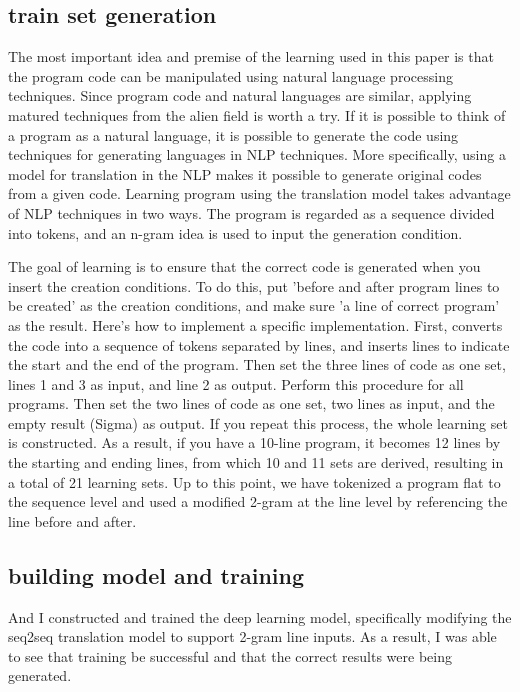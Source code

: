 \documentclass[nocopyrightspace]{sigplanconf}
\begin{document}
\subsection{train set generation}

The most important idea and premise of the learning used in this paper is that the program code can be manipulated using natural language processing techniques. Since program code and natural languages are similar\cite{hindle2012naturalness}, applying matured techniques from the alien field is worth a try. If it is possible to think of a program as a natural language, it is possible to generate the code using techniques for generating languages in NLP techniques. More specifically, using a model for translation in the NLP makes it possible to generate original codes from a given code. Learning program using the translation model takes advantage of NLP techniques in two ways. The program is regarded as a sequence divided into tokens, and an n-gram idea is used to input the generation condition.

The goal of learning is to ensure that the correct code is generated when you insert the creation conditions. To do this, put 'before and after program lines to be created' as the creation conditions, and make sure 'a line of correct program' as the result. Here's how to implement a specific implementation. First, converts the code into a sequence of tokens separated by lines, and inserts lines to indicate the start and the end of the program. Then set the three lines of code as one set, lines 1 and 3 as input, and line 2 as output. Perform this procedure for all programs. Then set the two lines of code as one set, two lines as input, and the empty result (Sigma) as output. If you repeat this process, the whole learning set is constructed. As a result, if you have a 10-line program, it becomes 12 lines by the starting and ending lines, from which 10 and 11 sets are derived, resulting in a total of 21 learning sets. Up to this point, we have tokenized a program flat to the sequence level and used a modified 2-gram at the line level by referencing the line before and after.

\subsection{building model and training}

And I constructed and trained the deep learning model, specifically modifying the seq2seq translation model to support 2-gram line inputs. As a result, I was able to see that training be successful and that the correct results were being generated.
\end{document}

